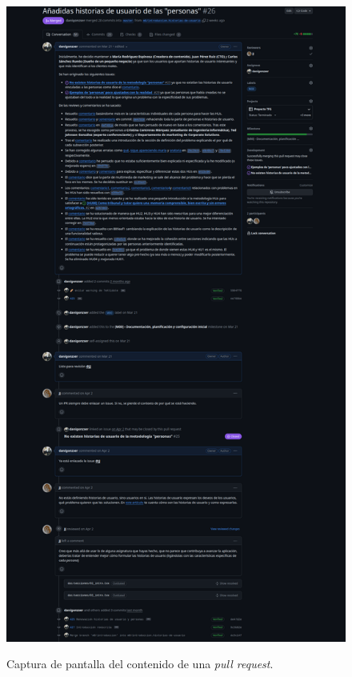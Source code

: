 \begin{figure}[H]
    \caption{Captura de pantalla del contenido de una \textit{pull request}.}
    \centering
    \vspace*{0.5cm}
    \includegraphics[scale=0.1]{figuras/pull_request_github.png}\label{fig:contenido_pull_request}
\end{figure}


